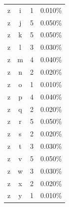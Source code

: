 \begin{longtable}{cccc}
    z & i & 1 & 0.010\% \\
    z & j & 5 & 0.050\% \\
    z & k & 5 & 0.050\% \\
    z & l & 3 & 0.030\% \\
    z & m & 4 & 0.040\% \\
    z & n & 2 & 0.020\% \\
    z & o & 1 & 0.010\% \\
    z & p & 4 & 0.040\% \\
    z & q & 2 & 0.020\% \\
    z & r & 5 & 0.050\% \\
    z & s & 2 & 0.020\% \\
    z & t & 3 & 0.030\% \\
    z & v & 5 & 0.050\% \\
    z & w & 3 & 0.030\% \\
    z & x & 2 & 0.020\% \\
    z & y & 1 & 0.010\% \\
\end{longtable}

\newpage
